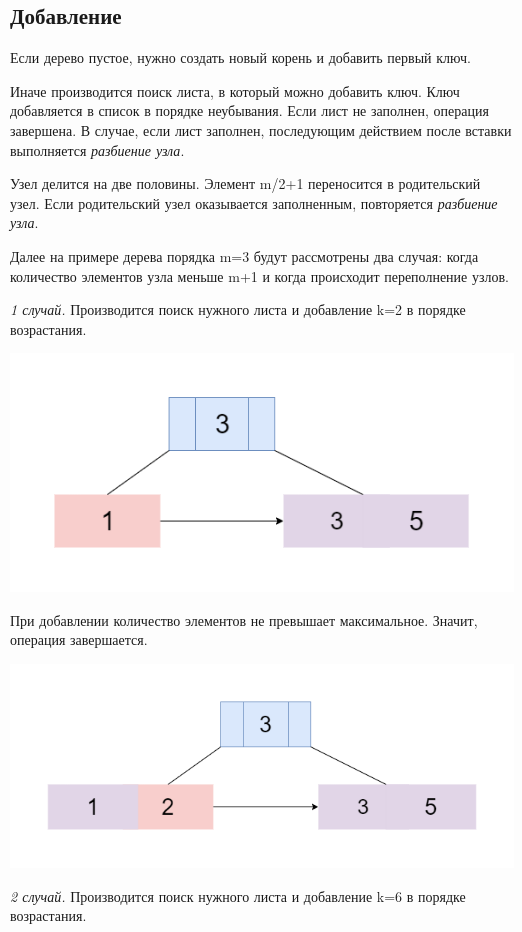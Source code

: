 \documentclass{article}
\begin{document}
\subsection{Добавление}
Если дерево пустое, нужно создать новый корень и добавить первый ключ.

 Иначе производится поиск листа, в который можно добавить ключ. Ключ добавляется в список в порядке неубывания. Если лист не заполнен, операция завершена. В случае, если лист заполнен, последующим действием после вставки выполняется \textit{разбиение узла}.

Узел делится на две половины. Элемент m/2+1 переносится в родительский узел. Если родительский узел оказывается заполненным, повторяется \textit{разбиение узла}.

Далее на примере дерева порядка m=3 будут рассмотрены два случая: когда количество элементов узла меньше m+1 и когда происходит переполнение узлов.


\textit{1 случай.} Производится поиск нужного листа и добавление k=2 в порядке возрастания.

\includegraphics[scale=0.4]{binsert11.png}

При добавлении количество элементов не превышает максимальное. Значит, операция завершается.

\includegraphics[scale=0.4]{binsert2.png}

\textit{2 случай.} Производится поиск нужного листа и добавление k=6 в порядке возрастания.
\end{document}
